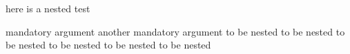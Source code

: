 here is a nested test
\begin{one}

	{mandatory argument}
	{another mandatory argument}
	to be nested to be nested
	to be nested to be nested
	to be nested to be nested
\end{one}
